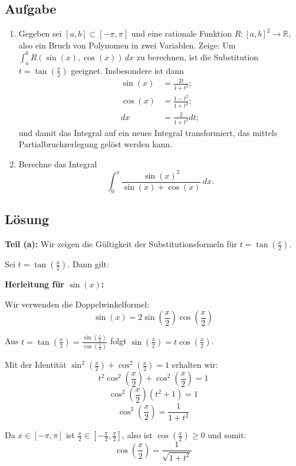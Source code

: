 \documentclass{article}
\begin{document}
\subsection*{Aufgabe}
\begin{enumerate}
\item Gegeben sei $[a,b]\subset[-\pi,\pi]$ und eine rationale Funktion $R:[a,b]^2\to \mathbb{R}$, also ein Bruch von Polynomen in zwei Variablen. Zeige: Um $\int_a^b R(\sin(x),\cos(x))\,dx$ zu berechnen, ist die Substitution $t=\tan(\frac{x}{2})$ geeignet. Insbesondere ist dann 
\begin{equation*}
\begin{split}
\sin(x)&=\frac{2t}{1+t^2};\\
\cos(x)&=\frac{1-t^2}{1+t^2};\\
dx&=\frac{2}{1+t^2}dt;
\end{split}
\end{equation*}
und damit das Integral auf ein neues Integral transformiert, das mittels Partialbruchzerlegung gelöst werden kann.
\item Berechne das Integral 
$$\int_0^\pi \frac{\sin(x)^2}{\sin(x)+\cos(x)}\,dx.$$
\end{enumerate}

\subsection*{Lösung}

\textbf{Teil (a):} Wir zeigen die Gültigkeit der Substitutionsformeln für $t = \tan(\frac{x}{2})$.

Sei $t = \tan(\frac{x}{2})$. Dann gilt:

\textbf{Herleitung für $\sin(x)$:}

Wir verwenden die Doppelwinkelformel:
$$\sin(x) = 2\sin\left(\frac{x}{2}\right)\cos\left(\frac{x}{2}\right)$$

Aus $t = \tan(\frac{x}{2}) = \frac{\sin(\frac{x}{2})}{\cos(\frac{x}{2})}$ folgt $\sin(\frac{x}{2}) = t\cos(\frac{x}{2})$.

Mit der Identität $\sin^2(\frac{x}{2}) + \cos^2(\frac{x}{2}) = 1$ erhalten wir:
$$t^2\cos^2\left(\frac{x}{2}\right) + \cos^2\left(\frac{x}{2}\right) = 1$$
$$\cos^2\left(\frac{x}{2}\right)(t^2 + 1) = 1$$
$$\cos^2\left(\frac{x}{2}\right) = \frac{1}{1+t^2}$$

Da $x \in [-\pi, \pi]$ ist $\frac{x}{2} \in [-\frac{\pi}{2}, \frac{\pi}{2}]$, also ist $\cos(\frac{x}{2}) \geq 0$ und somit:
$$\cos\left(\frac{x}{2}\right) = \frac{1}{\sqrt{1+t^2}}$$
\end{document}
